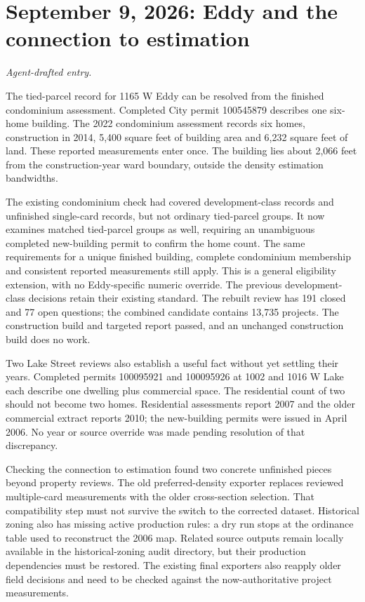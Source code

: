 \clearpage
\section*{September 9, 2026: Eddy and the connection to estimation}
\textit{Agent-drafted entry.}

The tied-parcel record for 1165 W Eddy can be resolved from the finished condominium assessment. Completed City permit 100545879 describes one six-home building. The 2022 condominium assessment records six homes, construction in 2014, 5,400 square feet of building area and 6,232 square feet of land. These reported measurements enter once. The building lies about 2,066 feet from the construction-year ward boundary, outside the density estimation bandwidths.

The existing condominium check had covered development-class records and unfinished single-card records, but not ordinary tied-parcel groups. It now examines matched tied-parcel groups as well, requiring an unambiguous completed new-building permit to confirm the home count. The same requirements for a unique finished building, complete condominium membership and consistent reported measurements still apply. This is a general eligibility extension, with no Eddy-specific numeric override. The previous development-class decisions retain their existing standard. The rebuilt review has 191 closed and 77 open questions; the combined candidate contains 13,735 projects. The construction build and targeted report passed, and an unchanged construction build does no work.

Two Lake Street reviews also establish a useful fact without yet settling their years. Completed permits 100095921 and 100095926 at 1002 and 1016 W Lake each describe one dwelling plus commercial space. The residential count of two should not become two homes. Residential assessments report 2007 and the older commercial extract reports 2010; the new-building permits were issued in April 2006. No year or source override was made pending resolution of that discrepancy.

Checking the connection to estimation found two concrete unfinished pieces beyond property reviews. The old preferred-density exporter replaces reviewed multiple-card measurements with the older cross-section selection. That compatibility step must not survive the switch to the corrected dataset. Historical zoning also has missing active production rules: a dry run stops at the ordinance table used to reconstruct the 2006 map. Related source outputs remain locally available in the historical-zoning audit directory, but their production dependencies must be restored. The existing final exporters also reapply older field decisions and need to be checked against the now-authoritative project measurements.

